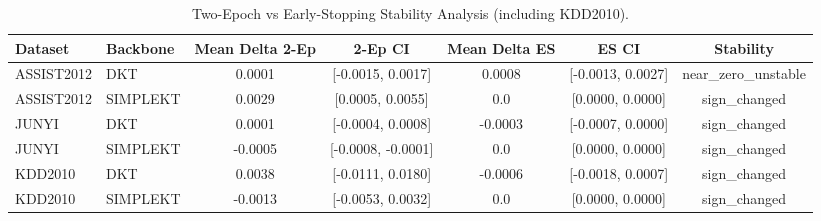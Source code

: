 \begin{table}[h]
\centering
\caption{Two-Epoch vs Early-Stopping Stability Analysis (including KDD2010).}
\label{tab:two_epoch_vs_early_stopping}
\begin{tabular}{llccccc}
\toprule
Dataset & Backbone & Mean Delta 2-Ep & 2-Ep CI & Mean Delta ES & ES CI & Stability \\
\midrule
ASSIST2012 & DKT & 0.0001 & [-0.0015, 0.0017] & 0.0008 & [-0.0013, 0.0027] & near_zero_unstable \\
ASSIST2012 & SIMPLEKT & 0.0029 & [0.0005, 0.0055] & 0.0 & [0.0000, 0.0000] & sign_changed \\
JUNYI & DKT & 0.0001 & [-0.0004, 0.0008] & -0.0003 & [-0.0007, 0.0000] & sign_changed \\
JUNYI & SIMPLEKT & -0.0005 & [-0.0008, -0.0001] & 0.0 & [0.0000, 0.0000] & sign_changed \\
KDD2010 & DKT & 0.0038 & [-0.0111, 0.0180] & -0.0006 & [-0.0018, 0.0007] & sign_changed \\
KDD2010 & SIMPLEKT & -0.0013 & [-0.0053, 0.0032] & 0.0 & [0.0000, 0.0000] & sign_changed \\
\bottomrule
\end{tabular}
\end{table}
